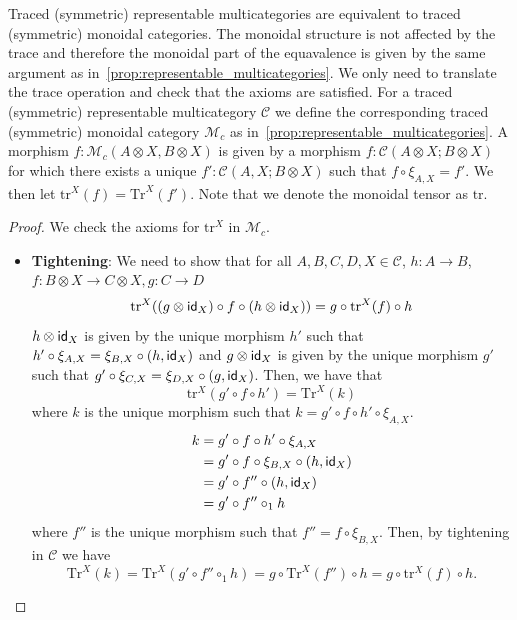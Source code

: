 \begin{example}
\begin{proposition}
Traced (symmetric) representable multicategories are equivalent to traced (symmetric) monoidal categories.
The monoidal structure is not affected by the trace and therefore the monoidal part of the equavalence is given by the same argument as in~\autoref{prop:representable_multicategories}.
We only need to translate the trace operation and check that the axioms are satisfied.
For a traced (symmetric) representable multicategory $\mathcal{C}$ we define the corresponding traced (symmetric) monoidal category $\mathcal{M}_{c}$ as in~\autoref{prop:representable_multicategories}.
A morphism $f : \mathcal{M}_{c}(A \otimes X, B \otimes X)$ is given by a morphism $f : \mathcal{C}(A \otimes X; B \otimes X)$ for which there exists a unique $f' : \mathcal{C}(A, X; B \otimes X)$ such that $f \circ \xi_{A,X} = f'$.
We then let $\text{tr}^{X}(f) = \text{Tr}^{X}(f')$.
Note that we denote the monoidal tensor as $\text{tr}$.
\end{proposition}
\begin{proof}
  We check the axioms for $\text{tr}^{X}$ in $\mathcal{M}_{c}$.
  \begin{itemize}
    \item \textbf{Tightening}: We need to show that for all $A,B,C,D,X \in \mathcal{C}$, $h : A \to B$, $f : B \otimes X \to C \otimes X, g : C \to D$
    \[
    \text{tr}^{X}((g \otimes \textsf{id}_{X}) \circ f \circ (h \otimes \textsf{id}_{X})) = g \circ \text{tr}^{X}(f) \circ h
    \]
    $h \otimes \textsf{id}_{X}$ is given by the unique morphism $h'$ such that $h' \circ \xi_{A,X} = \xi_{B,X} \circ (h, \textsf{id}_{X})$ and $g \otimes \textsf{id}_{X}$ is given by the unique morphism $g'$ such that $g' \circ \xi_{C,X} = \xi_{D,X} \circ (g, \textsf{id}_{X})$.
    Then, we have that 
    \[
    \text{tr}^{X}(g' \circ f \circ h') = \text{Tr}^{X}(k)
    \]
    where $k$ is the unique morphism such that $k = g' \circ f \circ h' \circ \xi_{A,X}$.
    \begin{align*}
      k &= g' \circ f \circ h' \circ \xi_{A,X}\\
      &= g' \circ f \circ \xi_{B,X} \circ (h, \textsf{id}_{X})\\
      &= g' \circ f'' \circ (h, \textsf{id}_{X})\\
      &= g' \circ f'' \circ_{1} h\\
    \end{align*}
    where $f''$ is the unique morphism such that $f'' = f \circ \xi_{B,X}$.
    Then, by tightening in $\mathcal{C}$ we have
    \[
    \text{Tr}^{X}(k) = \text{Tr}^{X}(g' \circ f'' \circ_{1} h) = g \circ \text{Tr}^{X}(f'') \circ h = g \circ \text{tr}^{X}(f) \circ h.
\]
\end{itemize}
\end{proof}
\end{example}
